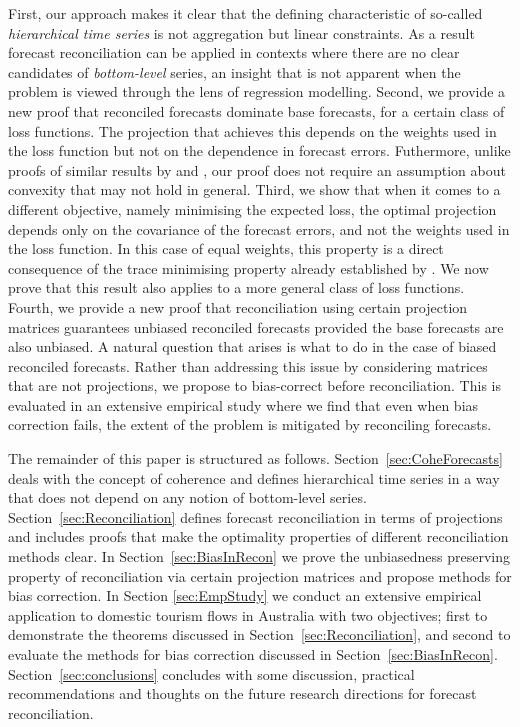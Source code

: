 \documentclass[12pt]{article}
\theoremstyle{definition}
\begin{document}
First, our approach makes it clear that the defining characteristic of so-called \emph{hierarchical time series} is not aggregation but linear constraints. As a result forecast reconciliation can be applied in contexts where there are no clear candidates of \emph{bottom-level} series, an insight that is not apparent when the problem is viewed through the lens of regression modelling. Second, {\color{blue} we provide a new proof that reconciled forecasts dominate base forecasts, for a certain class of loss functions. The projection that achieves this depends on the weights used in the loss function but not on the dependence in forecast errors.}  Futhermore, unlike {\color{blue} proofs of similar results by} \citet{VanErven2015a} and \citet{WicEtAl2019}, our proof does not require an assumption about convexity that may not hold in general.  {\color{blue} Third, we show that when it comes to a different objective, namely minimising the expected loss, the optimal projection depends only on the covariance of the forecast errors, and not the weights used in the loss function.  In this case of equal weights, this property is a direct consequence of the trace minimising property already established by \cite{WicEtAl2019}. We now prove that this result also applies to a more general class of loss functions.  Fourth}, we provide a new proof that reconciliation using certain projection matrices guarantees unbiased reconciled forecasts provided the base forecasts are also unbiased. A natural question that arises is what to do in the case of biased reconciled forecasts. Rather than addressing this issue by considering matrices that are not projections, we propose to bias-correct before reconciliation. This is evaluated in an extensive empirical study where we find that even when bias correction fails, the extent of the problem is mitigated by reconciling forecasts.

The remainder of this paper is structured as follows. Section~\ref{sec:CoheForecasts} deals with the concept of coherence and defines hierarchical time series in a way that does not depend on any notion of bottom-level series. Section~\ref{sec:Reconciliation} defines forecast reconciliation in terms of projections and includes proofs that make the optimality properties of different reconciliation methods clear. In Section~\ref{sec:BiasInRecon} we prove the unbiasedness preserving property of reconciliation via certain projection matrices and propose methods for bias correction. In Section \ref{sec:EmpStudy} we conduct an extensive empirical application to domestic tourism flows in Australia with two objectives; first to demonstrate the theorems discussed in Section~\ref{sec:Reconciliation}, and second to evaluate the methods for bias correction discussed in Section~\ref{sec:BiasInRecon}. Section~\ref{sec:conclusions} concludes with some discussion, {\color{blue} practical recommendations} and thoughts on the future research directions {\color{blue}for} forecast reconciliation.
\end{document}
